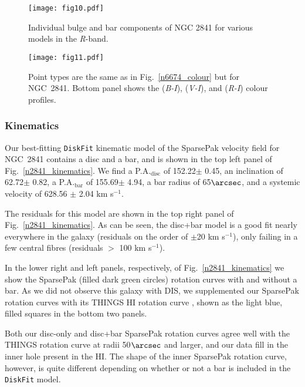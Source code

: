 \documentclass[a4paper,fleqn,usenatbib]{mnras}
\begin{document}
\begin{figure}
	\center
	\texttt{[image: fig10.pdf]}
	\caption{Individual bulge and bar components of NGC 2841 for various models in the \textit{R}-band.}
	\label{n2841_components}	
\end{figure}

\begin{figure}
	\center
    	\texttt{[image: fig11.pdf]}
  	\caption{Point types are the same as in Fig.~\ref{n6674_colour} but for NGC~2841. Bottom panel shows the (\textit{B-I}), (\textit{V-I}), and (\textit{R-I}) colour profiles.}
  	\label{n2841_colour}
\end{figure}

\subsubsection{Kinematics}
\label{sec:n2841kine}

Our best-fitting \texttt{DiskFit} kinematic model of the SparsePak velocity field for NGC~2841 contains a disc and a bar, and is shown in the top left panel of Fig.~\ref{n2841_kinematics}. We find a P.A.$_{\mathrm{disc}}$ of 152.22\degr $\pm$ 0.45\degr, an inclination of 62.72\degr $\pm$ 0.82\degr, a P.A.$_{\mathrm{bar}}$ of 155.69\degr $\pm$ 4.94\degr, a bar radius of 65$\arcsec$, and a systemic velocity of 628.56 $\pm$ 2.04 km s$^{-1}$. 

The residuals for this model are shown in the top right panel of Fig.~\ref{n2841_kinematics}. As can be seen, the disc+bar model is a good fit nearly everywhere in the galaxy (residuals on the order of $\pm$20 km s$^{-1}$), only failing in a few central fibres (residuals $>$ 100 km s$^{-1}$). 

In the lower right and left panels, respectively, of Fig.~\ref{n2841_kinematics} we show the SparsePak (filled dark green  circles) rotation curves with and without a bar.  As we did not observe this galaxy with DIS, we supplemented our SparsePak rotation curves with its THINGS HI rotation curve \citep{deblok2008}, shown as the light blue, filled squares in the bottom two panels. 

Both our disc-only and disc+bar SparsePak rotation curves agree well with the THINGS rotation curve at radii 50$\arcsec$ and larger, and our data fill in the inner hole present in the HI. The shape of the inner SparsePak rotation curve, however, is quite different depending on whether or not a bar is included in the \texttt{DiskFit} model.
\end{document}
